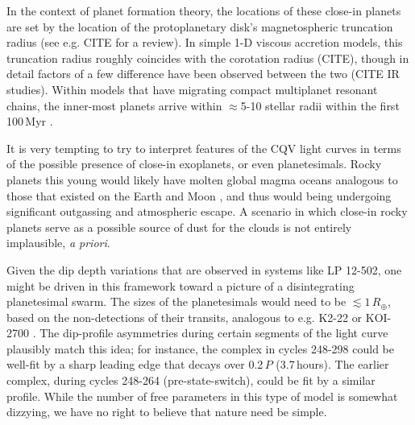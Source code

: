 \documentclass[11pt,twocolumn,tighten]{aastex63}
\begin{document}
In the context of planet formation theory, the locations of these
close-in planets are set by the location of the protoplanetary disk's
magnetospheric truncation radius (see e.g. CITE for a review).  In
simple 1-D viscous accretion models, this truncation radius roughly
coincides with the corotation radius (CITE), though in
detail factors of a few difference have been observed between the two
(CITE IR studies).  Within models that have migrating compact
multiplanet resonant chains, the inner-most planets arrive within
$\approx$5-10 stellar radii within the first 100\,Myr \citep{2018haex.bookE.142I}.

It is very tempting to try to interpret features of the
CQV light curves in terms of the possible presence of close-in
exoplanets, or even planetesimals.  Rocky planets this
young would likely have molten global magma oceans analogous to those that
existed on the Earth and Moon \citep[see][]{2022arXiv220310023L}, and thus
would being undergoing significant outgassing and atmospheric escape.  A
scenario in which close-in rocky planets serve as a possible source of
dust for the clouds is not entirely implausible, {\it a priori}.

Given the dip depth variations that are observed in systems like LP
12-502, one might be driven in this framework toward a picture of a
disintegrating planetesimal swarm.  
The sizes of the planetesimals would need to be $\lesssim 1$\,$R_\oplus$,
based on the non-detections of their transits, analogous to e.g. 
K2-22 \citep{2015ApJ...812..112S} or KOI-2700 \citep{2014ApJ...784...40R}.
The dip-profile asymmetries during
certain segments of the light curve plausibly match this idea; for
instance, the complex in cycles 248-298 could be well-fit by a sharp
leading edge that decays over 0.2\,$P$ (3.7\,hours).  The earlier
complex, during cycles 248-264 (pre-state-switch), could be fit by a
similar profile.  While the number of free parameters in this type of
model is somewhat dizzying, we have no right to believe that nature
need be simple.


\end{document}

